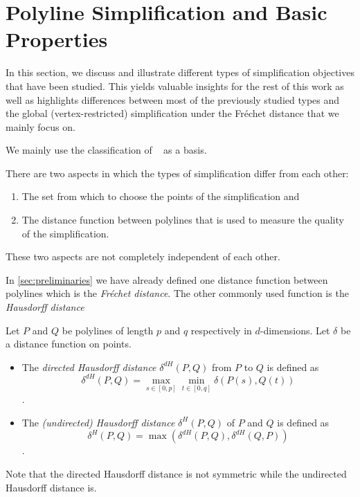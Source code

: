 \section{Polyline Simplification and Basic Properties}\label{sec:polyline-simplification}
In this section, we discuss and illustrate different types of simplification objectives that have been studied. 
This yields valuable insights for the rest of this work as well as highlights differences between most of the previously studied
types and the global (vertex-restricted) simplification under the Fréchet distance that we mainly focus on.

We mainly use the classification of \citeauthor{global_curve_simplification}~\cite{global_curve_simplification} as a basis. 

There are two aspects in which the types of simplification differ from each other:
\begin{enumerate}
  \item The set from which to choose the points of the simplification and 
	\item The distance function between polylines that is used to measure the quality of the simplification. 
\end{enumerate}

These two aspects are not completely independent of each other.

In \cref{sec:preliminaries} we have already defined one distance function between polylines which is the \emph{Fréchet distance}. The other commonly used function is the \emph{Hausdorff distance}

\begin{definition}
  Let \(P\) and \(Q\) be polylines of length \(p\) and \(q\) respectively in \(d\)-dimensions. Let \(\delta\) be a distance function on points. 

	\begin{itemize}
		\item The \emph{directed Hausdorff distance} \(\delta^{dH}(P, Q)\) from \(P\) to \(Q\) is defined as 
		\[\delta^{dH}(P, Q) = \max_{s \in [0, p]}\min_{t \in [0, q]} \delta(P(s), Q(t))\].
		\item The \emph{(undirected) Hausdorff distance} \(\delta^{H}(P, Q)\) of \(P\) and \(Q\) is defined as 
		\[\delta^{H}(P, Q) = \max(\delta^{dH}(P, Q), \delta^{dH}(Q, P))\].
	\end{itemize}

	Note that the directed Hausdorff distance is not symmetric while the undirected Hausdorff distance is.
\end{definition}

